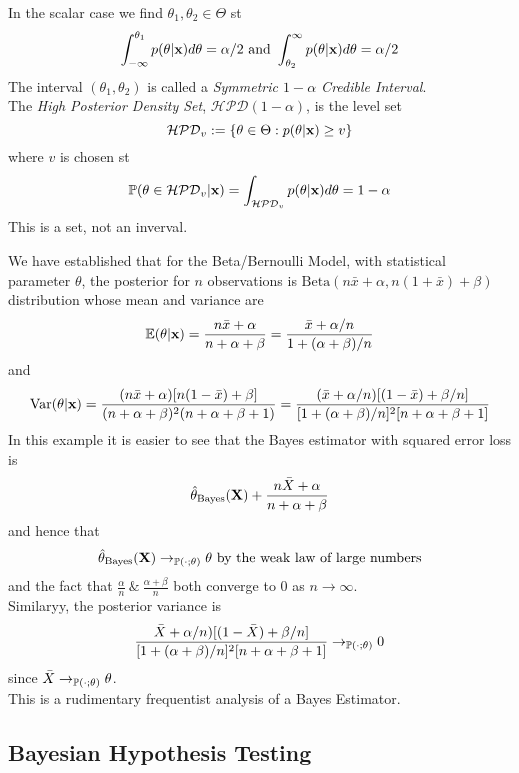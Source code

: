 \documentclass[11pt,a4paper]{article}
\begin{document}
In the scalar case we find $\theta_1,\theta_2\in\Theta$ st
$$\int_{-\infty}^{\theta_1}p(\theta|\textbf{x})d\theta=\alpha/2\text{ and }\int_{\theta_2}^\infty p(\theta|\textbf{x})d\theta=\alpha/2$$
The interval $(\theta_1,\theta_2)$ is called a \textit{Symmetric $1-\alpha$ Credible Interval}.\\

The \textit{High Posterior Density Set}, $\mathcal{HPD}(1-\alpha)$, is the level set
$$\mathcal{HPD}_v:=\{\theta\in\Theta:p(\theta|\textbf{x})\geq v\}$$
where $v$ is chosen st
$$\mathbb{P}(\theta\in\mathcal{HPD}_v|\textbf{x})=\int_{\mathcal{HPD}_v}p(\theta|\textbf{x})d\theta=1-\alpha$$
\nb This is a set, not an inverval.\\



\example{}
We have established that for the Beta/Bernoulli Model, with statistical parameter $\theta$, the posterior for $n$ observations is $\text{Beta}(n\bar{x}+\alpha,n(1+\bar{x})+\beta)$ distribution whose mean and variance are
$$\mathbb{E}(\theta|\textbf{x})=\frac{n\bar{x}+\alpha}{n+\alpha+\beta}=\frac{\bar{x}+\alpha/n}{1+(\alpha+\beta)/n}$$
and
$$\mathrm{Var}(\theta|\textbf{x})=\frac{(n\bar{x}+\alpha)[n(1-\bar{x})+\beta]}{(n+\alpha+\beta)^2(n+\alpha+\beta+1)}=\frac{(\bar{x}+\alpha/n)[(1-\bar{x})+\beta/n]}{[1+(\alpha+\beta)/n]^2[n+\alpha+\beta+1]}$$
In this example it is easier to see that the Bayes estimator with squared error loss is
$$\hat\theta_\text{Bayes}(\textbf{X})+\frac{n\bar{X}+\alpha}{n+\alpha+\beta}$$
and hence that
$$\hat\theta_\text{Bayes}(\textbf{X})\to_{\mathbb{P}(\cdot;\theta)}\theta\text{ by the weak law of large numbers}$$
and the fact that $\frac\alpha{n}\ \&\ \frac{\alpha+\beta}{n}$ both converge to 0 as $n\to\infty$.\\
Similaryy, the posterior variance is
$$\frac{\bar{X}+\alpha/n)[(1-\bar{X})+\beta/n]}{[1+(\alpha+\beta)/n]^2[n+\alpha+\beta+1]} \to_{\mathbb{P}(\cdot;\theta)}0$$
since $\bar{X}\to_{\mathbb{P}(\cdot;\theta)}\theta$.\\
This is a rudimentary frequentist analysis of a Bayes Estimator.

\subsection{Bayesian Hypothesis Testing}
\newpage
\setcounter{section}{-1}
\end{document}
